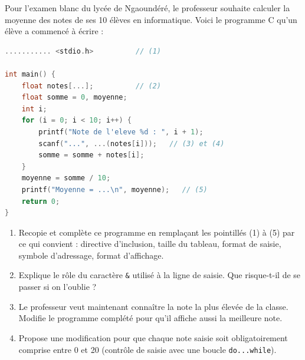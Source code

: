 \documentclass[11pt]{article}
\begin{document}
\begin{exercice}
Pour l'examen blanc du lycée de Ngaoundéré, le professeur souhaite calculer la moyenne des notes de ses 10 élèves en informatique. Voici le programme C qu'un élève a commencé à écrire :
\begin{lstlisting}[language=C]
........... <stdio.h>          // (1)

int main() {
    float notes[...];          // (2)
    float somme = 0, moyenne;
    int i;
    for (i = 0; i < 10; i++) {
        printf("Note de l'eleve %d : ", i + 1);
        scanf("...", ...(notes[i]));   // (3) et (4)
        somme = somme + notes[i];
    }
    moyenne = somme / 10;
    printf("Moyenne = ...\n", moyenne);   // (5)
    return 0;
}
\end{lstlisting}
\begin{enumerate}
\item Recopie et complète ce programme en remplaçant les pointillés (1) à (5) par ce qui convient : directive d'inclusion, taille du tableau, format de saisie, symbole d'adressage, format d'affichage.
\item Explique le rôle du caractère \texttt{\&} utilisé à la ligne de saisie. Que risque-t-il de se passer si on l'oublie ?
\item Le professeur veut maintenant connaître la note la plus élevée de la classe. Modifie le programme complété pour qu'il affiche aussi la meilleure note.
\item Propose une modification pour que chaque note saisie soit obligatoirement comprise entre 0 et 20 (contrôle de saisie avec une boucle \texttt{do...while}).
\end{enumerate}
\end{exercice}
\end{document}
